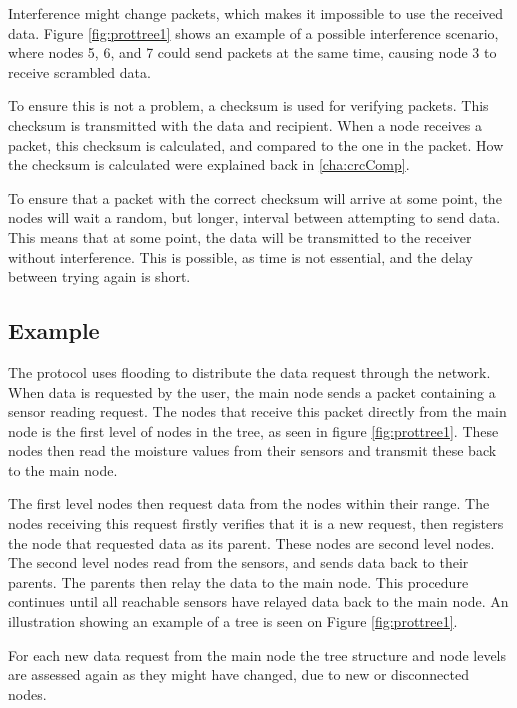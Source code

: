 Interference might change packets, which makes it impossible to use the received data. Figure \ref{fig:prottree1} shows an example of a possible interference scenario, where nodes 5, 6, and 7 could send packets at the same time, causing node 3 to receive scrambled data.

To ensure this is not a problem, a checksum is used for verifying packets. This checksum is transmitted with the data and recipient. When a node receives a packet, this checksum is calculated, and compared to the one in the packet. How the checksum is calculated were explained back in \ref{cha:crcComp}.

To ensure that a packet with the correct checksum will arrive at some point, the nodes will wait a random, but longer, interval between attempting to send data. This means that at some point, the data will be transmitted to the receiver without interference. 
This is possible, as time is not essential, and the delay between trying again is short.


\subsection*{Example}
The protocol uses flooding to distribute the data request through the network. 
When data is requested by the user, the main node sends a packet containing a sensor reading request. 
The nodes that receive this packet directly from the main node is the first level of nodes in the tree, as seen in figure \ref{fig:prottree1}. 
These nodes then read the moisture values from their sensors and transmit these back to the main node. 

The first level nodes then request data from the nodes within their range. 
The nodes receiving this request firstly verifies that it is a new request, then registers the node that requested data as its parent. 
These nodes are second level nodes. The second level nodes read from the sensors, and sends data back to their parents. The parents then relay the data to the main node. 
This procedure continues until all reachable sensors have relayed data back to the main node.
An illustration showing an example of a tree is seen on Figure \ref{fig:prottree1}.

For each new data request from the main node the tree structure and node levels are assessed again as they might have changed, due to new or disconnected nodes.

